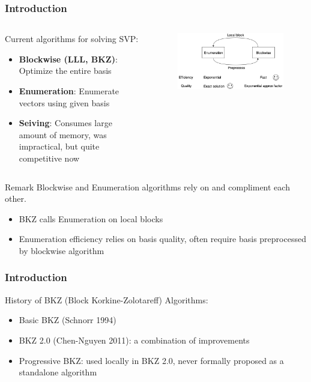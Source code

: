 \documentclass{beamer}
\begin{document}
\frame
{
  \frametitle{Introduction}
  \begin{columns}
  \begin{column}{0.5\textwidth}

  Current algorithms for solving SVP:
  \begin{itemize}
  	\item \textbf{Blockwise (LLL, BKZ)}: Optimize the entire basis
  	\item \textbf{Enumeration}: Enumerate vectors using given basis
  	\item \textbf{Seiving}: Consumes large amount of memory, was impractical, but quite competitive now
  \end{itemize}

  \end{column}
  \begin{column}{0.5\textwidth}

  \begin{figure}[tb]
  	\centering
  	\includegraphics[width=\textwidth]{files/BKZ-SVP-Algorithms.png}
  	\label{fig:svp-alg}
  \end{figure}

  \end{column}
  \end{columns}
  \begin{block}{Remark}
  Blockwise and Enumeration algorithms rely on and compliment each other.
  \begin{itemize}
  	\item BKZ calls Enumeration on local blocks
  	\item Enumeration efficiency relies on basis quality, often require basis preprocessed by blockwise algorithm
  \end{itemize}
  \end{block}
}

\frame
{
  \frametitle{Introduction}
  History of BKZ (Block Korkine-Zolotareff) Algorithms:
  \begin{itemize}
  	\item Basic BKZ (Schnorr 1994)
  	\item BKZ 2.0 (Chen-Nguyen 2011): a combination of improvements
  	\item Progressive BKZ: used locally in BKZ 2.0, never formally proposed as a standalone algorithm
  \end{itemize}
}
\end{document}

